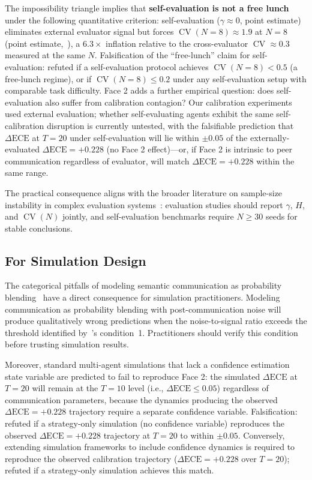 \documentclass[11pt]{article}
\DeclareMathOperator{\CV}{CV}
\begin{document}
The impossibility triangle implies that \textbf{self-evaluation is not a free lunch} under the following quantitative criterion: self-evaluation ($\gamma \approx 0$, point estimate) eliminates external evaluator signal but forces $\CV(N{=}8) \approx 1.9$ at $N = 8$ (point estimate,~\cite{liu2026impossible}), a $6.3\times$ inflation relative to the cross-evaluator $\CV \approx 0.3$ measured at the same $N$. Falsification of the ``free-lunch'' claim for self-evaluation: refuted if a self-evaluation protocol achieves $\CV(N{=}8) < 0.5$ (a free-lunch regime), or if $\CV(N{=}8) \leq 0.2$ under any self-evaluation setup with comparable task difficulty. Face 2 adds a further empirical question: does self-evaluation also suffer from calibration contagion? Our calibration experiments used external evaluation; whether self-evaluating agents exhibit the same self-calibration disruption is currently untested, with the falsifiable prediction that $\Delta\text{ECE}$ at $T = 20$ under self-evaluation will lie within $\pm 0.05$ of the externally-evaluated $\Delta\text{ECE} = +0.228$ (no Face 2 effect)---or, if Face 2 is intrinsic to peer communication regardless of evaluator, will match $\Delta\text{ECE} = +0.228$ within the same range.

The practical consequence aligns with the broader literature on sample-size instability in complex evaluation systems~\cite{button2013power,ioannidis2005most}: evaluation studies should report $\gamma$, $H$, and $\CV(N)$ jointly, and self-evaluation benchmarks require $N \geq 30$ seeds for stable conclusions.

\subsection{For Simulation Design}

The categorical pitfalls of modeling semantic communication as probability blending~\cite{foerster2016learning,kapetanakis2014balanced} have a direct consequence for simulation practitioners. Modeling communication as probability blending with post-communication noise will produce qualitatively wrong predictions when the noise-to-signal ratio exceeds the threshold identified by~\citet{foerster2016learning}'s condition~1. Practitioners should verify this condition before trusting simulation results.

Moreover, standard multi-agent simulations that lack a confidence estimation state variable are predicted to fail to reproduce Face 2: the simulated $\Delta\text{ECE}$ at $T = 20$ will remain at the $T = 10$ level (i.e., $\Delta\text{ECE} \leq 0.05$) regardless of communication parameters, because the dynamics producing the observed $\Delta\text{ECE} = +0.228$ trajectory require a separate confidence variable. Falsification: refuted if a strategy-only simulation (no confidence variable) reproduces the observed $\Delta\text{ECE} = +0.228$ trajectory at $T = 20$ to within $\pm 0.05$. Conversely, extending simulation frameworks to include confidence dynamics is required to reproduce the observed calibration trajectory ($\Delta\text{ECE} = +0.228$ over $T = 20$); refuted if a strategy-only simulation achieves this match.
\end{document}

